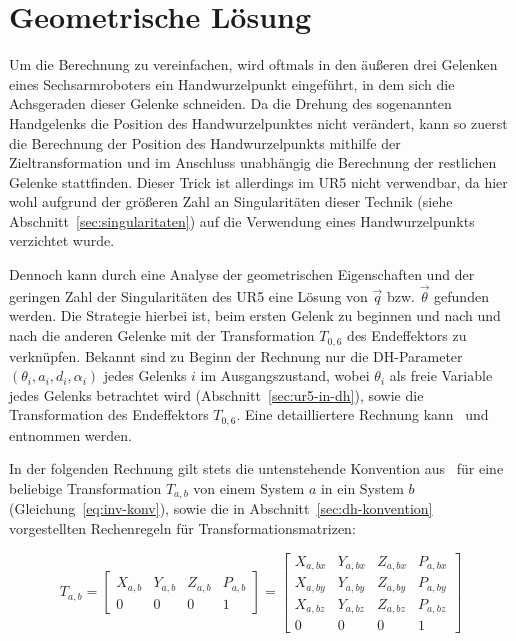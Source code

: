 \section{Geometrische Lösung}\label{sec:geometrische-losung}
Um die Berechnung zu vereinfachen, wird oftmals in den äußeren drei Gelenken eines Sechsarmroboters ein Handwurzelpunkt eingeführt, in dem sich die Achsgeraden dieser Gelenke schneiden.
Da die Drehung des sogenannten Handgelenks die Position des Handwurzelpunktes nicht verändert, kann so zuerst die Berechnung der Position des Handwurzelpunkts mithilfe der Zieltransformation und im Anschluss unabhängig die Berechnung der restlichen Gelenke stattfinden.
Dieser Trick ist allerdings im UR5 nicht verwendbar, da hier wohl aufgrund der größeren Zahl an Singularitäten dieser Technik (siehe Abschnitt~\ref{sec:singularitaten}) auf die Verwendung eines Handwurzelpunkts verzichtet wurde.

Dennoch kann durch eine Analyse der geometrischen Eigenschaften und der geringen Zahl der Singularitäten des UR5 eine Lösung von $\overrightarrow{q}$ bzw. $\overrightarrow{\theta}$ gefunden werden.
Die Strategie hierbei ist, beim ersten Gelenk zu beginnen und nach und nach die anderen Gelenke mit der Transformation $T_{0,6}$ des Endeffektors zu verknüpfen.
Bekannt sind zu Beginn der Rechnung nur die DH-Parameter $(\theta_i, a_i, d_i, \alpha_i)$ jedes Gelenks $i$ im Ausgangszustand, wobei $\theta_i$ als freie Variable jedes Gelenks betrachtet wird (Abschnitt~\ref{sec:ur5-in-dh}), sowie die Transformation des Endeffektors $T_{0,6}$.
Eine detailliertere Rechnung kann~\cite{rasmusandersenKinematicsUR52018} und~\cite{hawkinsAnalyticInverseKinematics2013} entnommen werden.

In der folgenden Rechnung gilt stets die untenstehende Konvention aus~\cite[82]{craigIntroductionRoboticsMechanics2009} für eine beliebige Transformation $T_{a,b}$ von einem System $a$ in ein System $b$ (Gleichung~\ref{eq:inv-konv}), sowie die in Abschnitt~\ref{sec:dh-konvention} vorgestellten Rechenregeln für Transformationsmatrizen:

\begin{equation}
    T_{a,b} = \begin{bmatrix}
                  X_{a,b} & Y_{a,b} & Z_{a,b} & P_{a,b} \\
                  0       & 0       & 0       & 1
    \end{bmatrix}
    = \begin{bmatrix}
          X_{a,bx} & Y_{a,bx} & Z_{a,bx} & P_{a,bx} \\
          X_{a,by} & Y_{a,by} & Z_{a,by} & P_{a,by} \\
          X_{a,bz} & Y_{a,bz} & Z_{a,bz} & P_{a,bz} \\
          0        & 0        & 0        & 1
    \end{bmatrix}
    \label{eq:inv-konv}
\end{equation}

